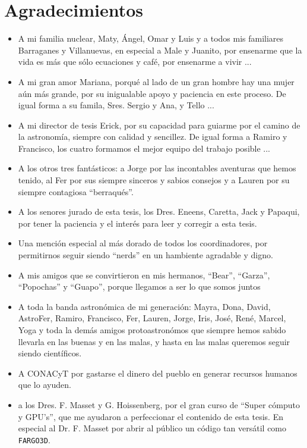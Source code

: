 \chapter*{Agradecimientos}

\begin{itemize}
\item A mi familia nuclear, Maty, \'Angel, Omar y Luis y a todos mis familiares Barraganes y Villanuevas, en especial a Male y Juanito, por ensenarme que la vida es m\'as que s\'olo ecuaciones y café, por ensenarme a vivir ...
\item A mi gran amor Mariana, porqué al lado de un gran hombre hay una mujer a\'un m\'as grande, por su inigualable apoyo y paciencia en este proceso. De igual forma a su famila,  Sres. Sergio y Ana, y Tello ... 
\item A mi director de tesis Erick, por su capacidad para guiarme por el camino de la astronom\'ia, siempre con calidad y sencillez. De igual forma a Ramiro y Francisco, los cuatro formamos el mejor equipo del trabajo posible ...
\item A los otros tres fant\'asticos: a Jorge por las incontables aventuras que hemos tenido, al Fer por sus siempre sinceros y sabios consejos y a Lauren por su siempre contagiosa ``berraqu\'es''.
\item A los senores jurado de esta tesis, los Dres. Eneens, Caretta, Jack y Papaqui, por tener la paciencia y el inter\'es para leer y corregir a esta tesis.
\item Una menci\'on especial al m\'as dorado de todos los coordinadores, por permitirnos seguir siendo ``nerds'' en un hambiente agradable y digno.  
\item A mis amigos que se convirtieron en mis hermanos, ``Bear'', ``Garza'', ``Popochas'' y ``Guapo'', porque llegamos a ser lo que somos juntos
\item A toda la banda astron\'omica de mi generaci\'on: Mayra, Dona, David, AstroFer, Ramiro, Francisco, Fer, Lauren, Jorge, Iris, Jos\'e, Ren\'e, Marcel, Yoga y toda la dem\'as amigos protoastron\'omos que siempre hemos sabido llevarla en las buenas y en las malas, y hasta en las malas queremos seguir siendo cient\'ificos.
\item A CONACyT por gastarse el dinero del pueblo en generar recursos humanos que lo ayuden.
\item a los Dres. F. Masset y G. Hoissenberg, por el gran curso de ``Super c\'omputo y GPU's'', que me ayudaron a perfeccionar el contenido de esta tesis. En especial al Dr. F. Masset por abrir al p\'ublico un c\'odigo tan vers\'atil como \texttt{FARGO3D}.
\end{itemize}


